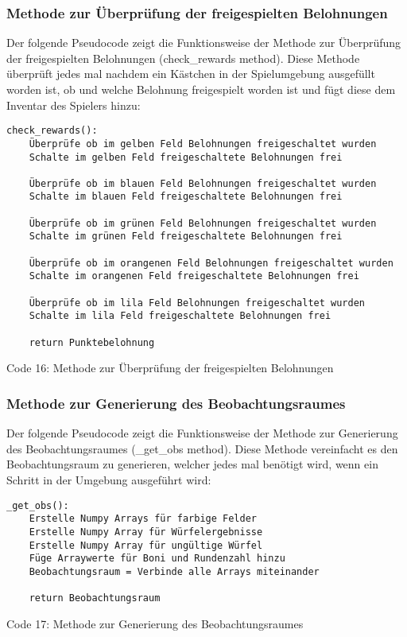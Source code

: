 \subsubsection{Methode zur Überprüfung der freigespielten Belohnungen}
\begin{minipage}{\linewidth}
Der folgende Pseudocode zeigt die Funktionsweise der Methode zur Überprüfung der freigespielten Belohnungen (check\_rewards method). Diese Methode überprüft jedes mal nachdem ein Kästchen in der Spielumgebung ausgefüllt worden ist, ob und welche Belohnung freigespielt worden ist und fügt diese dem Inventar des Spielers hinzu:
\vspace{0.5cm}
\begin{lstlisting}
check_rewards():
	Überprüfe ob im gelben Feld Belohnungen freigeschaltet wurden
	Schalte im gelben Feld freigeschaltete Belohnungen frei
	
	Überprüfe ob im blauen Feld Belohnungen freigeschaltet wurden
	Schalte im blauen Feld freigeschaltete Belohnungen frei
	
	Überprüfe ob im grünen Feld Belohnungen freigeschaltet wurden
	Schalte im grünen Feld freigeschaltete Belohnungen frei
	
	Überprüfe ob im orangenen Feld Belohnungen freigeschaltet wurden
	Schalte im orangenen Feld freigeschaltete Belohnungen frei
	
	Überprüfe ob im lila Feld Belohnungen freigeschaltet wurden
	Schalte im lila Feld freigeschaltete Belohnungen frei
	
	return Punktebelohnung
\end{lstlisting}
Code 16: Methode zur Überprüfung der freigespielten Belohnungen\\
\end{minipage}

\subsubsection{Methode zur Generierung des Beobachtungsraumes}
\begin{minipage}{\linewidth}
Der folgende Pseudocode zeigt die Funktionsweise der Methode zur Generierung des Beobachtungsraumes (\_get\_obs method). Diese Methode vereinfacht es den Beobachtungsraum zu generieren, welcher jedes mal benötigt wird, wenn ein Schritt in der Umgebung ausgeführt wird:
\vspace{0.5cm}
\begin{lstlisting}
_get_obs():
	Erstelle Numpy Arrays für farbige Felder
	Erstelle Numpy Array für Würfelergebnisse
	Erstelle Numpy Array für ungültige Würfel
	Füge Arraywerte für Boni und Rundenzahl hinzu
	Beobachtungsraum = Verbinde alle Arrays miteinander
	
	return Beobachtungsraum
\end{lstlisting}
Code 17: Methode zur Generierung des Beobachtungsraumes\\
\end{minipage}

